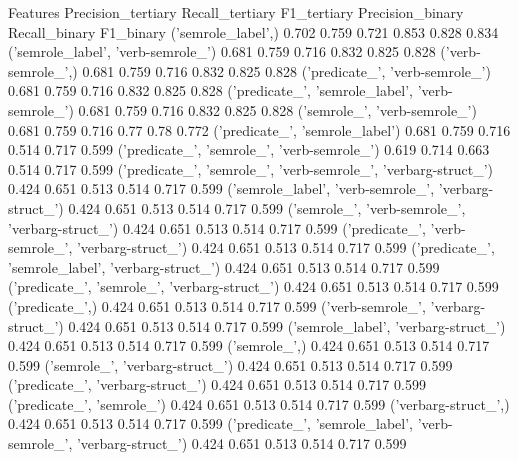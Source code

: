 Features	Precision_tertiary	Recall_tertiary	F1_tertiary	Precision_binary	Recall_binary	F1_binary
('semrole_label',)	0.702	0.759	0.721	0.853	0.828	0.834
('semrole_label', 'verb-semrole_')	0.681	0.759	0.716	0.832	0.825	0.828
('verb-semrole_',)	0.681	0.759	0.716	0.832	0.825	0.828
('predicate_', 'verb-semrole_')	0.681	0.759	0.716	0.832	0.825	0.828
('predicate_', 'semrole_label', 'verb-semrole_')	0.681	0.759	0.716	0.832	0.825	0.828
('semrole_', 'verb-semrole_')	0.681	0.759	0.716	0.77	0.78	0.772
('predicate_', 'semrole_label')	0.681	0.759	0.716	0.514	0.717	0.599
('predicate_', 'semrole_', 'verb-semrole_')	0.619	0.714	0.663	0.514	0.717	0.599
('predicate_', 'semrole_', 'verb-semrole_', 'verbarg-struct_')	0.424	0.651	0.513	0.514	0.717	0.599
('semrole_label', 'verb-semrole_', 'verbarg-struct_')	0.424	0.651	0.513	0.514	0.717	0.599
('semrole_', 'verb-semrole_', 'verbarg-struct_')	0.424	0.651	0.513	0.514	0.717	0.599
('predicate_', 'verb-semrole_', 'verbarg-struct_')	0.424	0.651	0.513	0.514	0.717	0.599
('predicate_', 'semrole_label', 'verbarg-struct_')	0.424	0.651	0.513	0.514	0.717	0.599
('predicate_', 'semrole_', 'verbarg-struct_')	0.424	0.651	0.513	0.514	0.717	0.599
('predicate_',)	0.424	0.651	0.513	0.514	0.717	0.599
('verb-semrole_', 'verbarg-struct_')	0.424	0.651	0.513	0.514	0.717	0.599
('semrole_label', 'verbarg-struct_')	0.424	0.651	0.513	0.514	0.717	0.599
('semrole_',)	0.424	0.651	0.513	0.514	0.717	0.599
('semrole_', 'verbarg-struct_')	0.424	0.651	0.513	0.514	0.717	0.599
('predicate_', 'verbarg-struct_')	0.424	0.651	0.513	0.514	0.717	0.599
('predicate_', 'semrole_')	0.424	0.651	0.513	0.514	0.717	0.599
('verbarg-struct_',)	0.424	0.651	0.513	0.514	0.717	0.599
('predicate_', 'semrole_label', 'verb-semrole_', 'verbarg-struct_')	0.424	0.651	0.513	0.514	0.717	0.599
